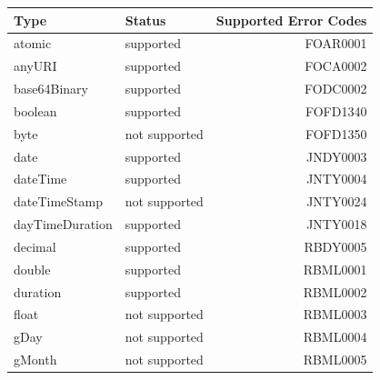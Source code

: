 \begin{table}
	\centering
	\begin{tabular}{|l|l|r|} 
		\hline
		\textbf{Type}         & \textbf{Status}  & \multicolumn{1}{c|}{\textbf{Supported Error Codes} }  \\ 
		\hline
		atomic                & supported        & FOAR0001                                              \\ 
		\cline{1-2}
		anyURI                & supported        & FOCA0002                                              \\ 
		\cline{1-2}
		base64Binary          & supported        & FODC0002                                              \\ 
		\cline{1-2}
		boolean               & supported        & FOFD1340                                              \\ 
		\cline{1-2}
		byte                  & not supported    & FOFD1350                                              \\ 
		\cline{1-2}
		date                  & supported        & JNDY0003                                              \\ 
		\cline{1-2}
		dateTime              & supported        & JNTY0004                                              \\ 
		\cline{1-2}
		dateTimeStamp         & not supported    & JNTY0024                                              \\ 
		\cline{1-2}
		dayTimeDuration       & supported        & JNTY0018                                              \\ 
		\cline{1-2}
		decimal               & supported        & RBDY0005                                              \\ 
		\cline{1-2}
		double                & supported        & RBML0001                                              \\ 
		\cline{1-2}
		duration              & supported        & RBML0002                                              \\ 
		\cline{1-2}
		float                 & not supported    & RBML0003                                              \\ 
		\cline{1-2}
		gDay                  & not supported    & RBML0004                                              \\ 
		\cline{1-2}
		gMonth                & not supported    & RBML0005                                              \\ 

\end{tabular}
\end{table}
